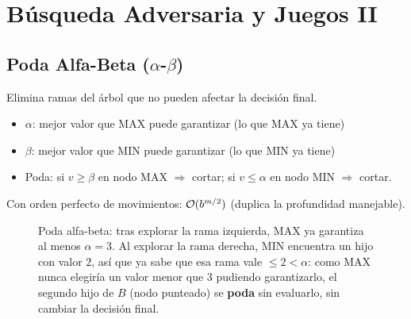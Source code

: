 \section{Búsqueda Adversaria y Juegos II}

\subsection{Poda Alfa-Beta ($\alpha$-$\beta$)}

Elimina ramas del árbol que no pueden afectar la decisión final.

\begin{itemize}
    \item $\alpha$: mejor valor que MAX puede garantizar (lo que MAX ya tiene)
    \item $\beta$: mejor valor que MIN puede garantizar (lo que MIN ya tiene)
    \item Poda: si $v \geq \beta$ en nodo MAX $\Rightarrow$ cortar; si $v \leq \alpha$ en nodo MIN $\Rightarrow$ cortar.
\end{itemize}

Con orden perfecto de movimientos: $\mathcal{O}(b^{m/2})$ (duplica la profundidad manejable).

\begin{figure}[H]
\centering
{}
\caption{Poda alfa-beta: tras explorar la rama izquierda, MAX ya garantiza al menos $\alpha=3$. Al explorar la rama
derecha, MIN encuentra un hijo con valor $2$, así que ya sabe que esa rama vale $\leq 2 < \alpha$: como MAX nunca
elegiría un valor menor que $3$ pudiendo garantizarlo, el segundo hijo de $B$ (nodo punteado) se \textbf{poda} sin
evaluarlo, sin cambiar la decisión final.}
\end{figure}

